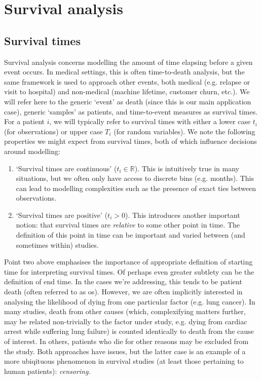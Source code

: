 \documentclass[../thesis.tex]{subfiles}
\begin{document}
\section{Survival analysis \label{sec:survival}}


\subsection{Survival times}
Survival analysis concerns modelling the amount of time elapsing before a given event occurs. In medical settings, this is often time-to-death analysis, but the same framework is used to approach other events, both medical (e.g. relapse or visit to hospital) and non-medical (machine lifetime, customer churn, etc.). We will refer here to the generic `event' as death (since this is our main application case), generic `samples' as patients, and time-to-event measures as survival times. For a patient $i$, we will typically refer to survival times with either a lower case $t_i$ (for observations) or upper case $T_i$ (for random variables). We note the following properties we might expect from survival times, both of which influence decisions around modelling:
\begin{enumerate}
    \item `Survival times are continuous' ($t_i \in \mathbb{R}$). This is intuitively true in many situations, but we often only have access to discrete bins (e.g. months). This can lead to modelling complexities such as the presence of exact ties between observations.
    \item `Survival times are positive' ($t_i > 0$). This introduces another important notion: that survival times are \emph{relative} to some other point in time. The definition of this point in time can be important and varied between (and sometimes within) studies.
\end{enumerate}
Point two above emphasises the importance of appropriate definition of starting time for interpreting survival times. Of perhaps even greater subtlety can be the definition of end time. In the cases we're addressing, this tends to be patient death (often referred to as \gls{os}). However, we are often implicitly interested in analysing the likelihood of dying from one particular factor (e.g. lung cancer). In many studies, death from other causes (which, complexifying matters further, may be related non-trivially to the factor under study, e.g. dying from cardiac arrest while suffering lung failure) is counted identically to death from the cause of interest. In others, patients who die for other reasons may be excluded from the study. Both approaches have issues, but the latter case is an example of a more ubiqituous phenomenon in survival studies (at least those pertaining to human patients): \emph{censoring}.
\end{document}

